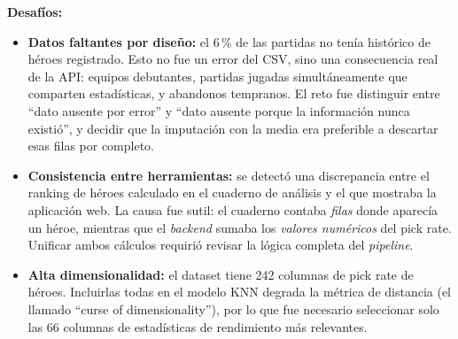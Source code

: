 \documentclass[12pt,a4paper]{article}
\begin{document}
\textbf{Desaf\'ios:}
\begin{itemize}
  \item \textbf{Datos faltantes por dise\~no:} el 6\,\% de las partidas no ten\'ia
        hist\'orico de h\'eroes registrado. Esto no fue un error del CSV, sino
        una consecuencia real de la API: equipos debutantes, partidas jugadas
        simult\'aneamente que comparten estad\'isticas, y abandonos tempranos.
        El reto fue distinguir entre ``dato ausente por error'' y ``dato ausente
        porque la informaci\'on nunca existi\'o'', y decidir que la imputaci\'on
        con la media era preferible a descartar esas filas por completo.
  \item \textbf{Consistencia entre herramientas:} se detect\'o una discrepancia
        entre el ranking de h\'eroes calculado en el cuaderno de an\'alisis y el
        que mostraba la aplicaci\'on web. La causa fue sutil: el cuaderno contaba
        \textit{filas} donde aparec\'ia un h\'eroe, mientras que el \textit{backend}
        sumaba los \textit{valores num\'ericos} del pick rate. Unificar ambos
        c\'alculos requiri\'o revisar la l\'ogica completa del \textit{pipeline}.
  \item \textbf{Alta dimensionalidad:} el dataset tiene 242 columnas de
        pick rate de h\'eroes. Incluirlas todas en el modelo KNN degrada la
        m\'etrica de distancia (el llamado ``curse of dimensionality''), por lo
        que fue necesario seleccionar solo las 66 columnas de estad\'isticas
        de rendimiento m\'as relevantes.
\end{itemize}
\end{document}
